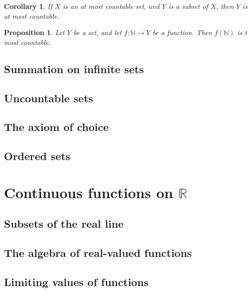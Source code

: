 \documentclass[
]{book}
\newtheorem{corollary}{Corollary}[chapter]
\newtheorem{proposition}{Proposition}[chapter]
\theoremstyle{definition}
\theoremstyle{definition}
\theoremstyle{definition}
\theoremstyle{definition}
\theoremstyle{remark}
\begin{document}
\begin{corollary}
If \(X\) is an at most countable set, and \(Y\) is a subset of \(X\), then \(Y\) is at most countable.
\end{corollary}

\begin{proposition}
Let \(Y\) be a set, and let \(f:\mathbb{N} \to Y\) be a function. Then \(f(\mathbb{N})\) is t most countable.
\end{proposition}

\section{Summation on infinite sets}\label{summation-on-infinite-sets}

\section{Uncountable sets}\label{uncountable-sets}

\section{The axiom of choice}\label{the-axiom-of-choice}

\section{Ordered sets}\label{ordered-sets}

\chapter{\texorpdfstring{Continuous functions on \(\mathbb{R}\)}{Continuous functions on \textbackslash mathbb\{R\}}}\label{continuous}

\section{Subsets of the real line}\label{subsets-of-the-real-line}

\section{The algebra of real-valued functions}\label{the-algebra-of-real-valued-functions}

\section{Limiting values of functions}\label{limiting-values-of-functions}
\end{document}
